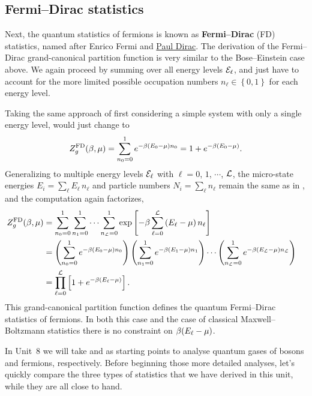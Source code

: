 \subsection{\label{sec:fermi}Fermi--Dirac statistics}
Next, the quantum statistics of fermions is known as \textbf{Fermi--Dirac} (FD) statistics, named after Enrico Fermi and \href{https://en.wikipedia.org/wiki/Paul_Dirac}{Paul Dirac}.
The derivation of the Fermi--Dirac grand-canonical partition function is very similar to the Bose--Einstein case above.
We again proceed by summing over all energy levels $\mathcal E_{\ell}$, and just have to account for the more limited possible occupation numbers $n_{\ell} \in \left\{0, 1\right\}$ for each energy level.

Taking the same approach of first considering a simple system with only a single energy level,  would just change to
\begin{equation*}
  Z_g^{\text{FD}}(\beta, \mu) = \sum_{n_0 = 0}^1 e^{-\beta (E_0 - \mu) n_0} = 1 + e^{-\beta (E_0 - \mu)}.
\end{equation*}
Generalizing to multiple energy levels $\mathcal E_{\ell}$ with $\ell = 0$, $1$, $\cdots$, $\mathcal L$, the micro-state energies $E_i = \sum_{\ell} E_{\ell} \, n_{\ell}$ and particle numbers $N_i = \sum_{\ell} n_{\ell}$ remain the same as in , and the computation again factorizes,
\begin{align}
  Z_g^{\text{FD}}(\beta, \mu) & = \sum_{n_0 = 0}^1 \sum_{n_1 = 0}^1 \cdots \sum_{n_{\mathcal L} = 0}^1 \exp\left[-\beta\sum_{\ell = 0}^{\mathcal L} \left(E_{\ell} - \mu\right) n_{\ell}\right] \cr
                 & = \left(\sum_{n_0 = 0}^1 e^{-\beta (E_0 - \mu) n_0}\right) \left(\sum_{n_1 = 0}^1 e^{-\beta (E_1 - \mu) n_1}\right)\cdots \left(\sum_{n_{\mathcal L} = 0}^1 e^{-\beta (E_{\mathcal L} - \mu) n_{\mathcal L}}\right) \cr
                 & = \prod_{\ell = 0}^{\mathcal L} \left[1 + e^{-\beta (E_{\ell} - \mu)}\right]. \label{eq:partfunc_FD}
\end{align}
This grand-canonical partition function defines the quantum Fermi--Dirac statistics of fermions.
In both this case and the case of classical Maxwell--Boltzmann statistics there is no constraint on $\beta (E_{\ell} - \mu)$.

In Unit~8 we will take \ZBE and \ZFD as starting points to analyse quantum gases of bosons and fermions, respectively.
Before beginning those more detailed analyses, let's quickly compare the three types of statistics that we have derived in this unit, while they are all close to hand.



